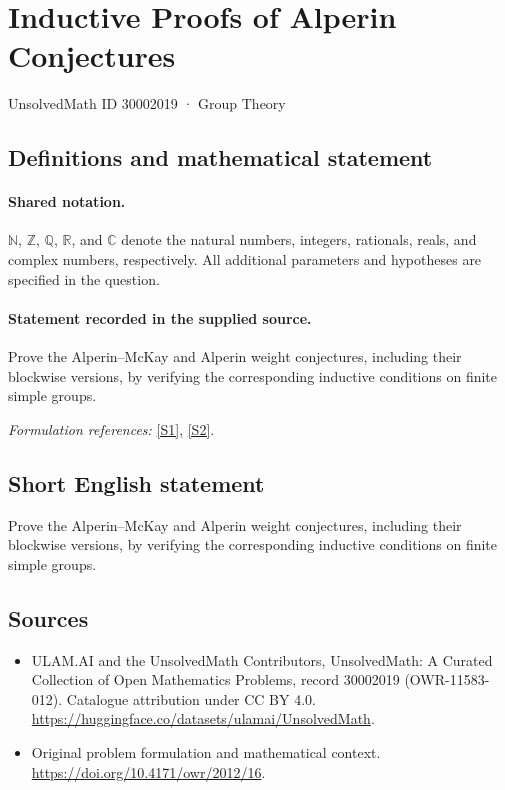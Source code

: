 \documentclass[11pt]{article}
\newcommand{\sref}[2]{\hyperlink{source:#1:#2}{[S#2]}}
\begin{document}
\setcounter{section}{30002018}
\section{Inductive Proofs of Alperin Conjectures}\label{30002019}
{\small UnsolvedMath ID 30002019 · Group Theory}
\subsection{Definitions and mathematical statement}

\paragraph{Shared notation.}$\mathbb N$, $\mathbb Z$, $\mathbb Q$, $\mathbb R$, and $\mathbb C$ denote the natural numbers, integers, rationals, reals, and complex numbers, respectively. All additional parameters and hypotheses are specified in the question.


\paragraph{Statement recorded in the supplied source.}
Prove the Alperin–McKay and Alperin weight conjectures, including their blockwise versions, by verifying the corresponding inductive conditions on finite simple groups.
\par\smallskip\textit{Formulation references:} \sref{30002019}{1}, \sref{30002019}{2}.
\subsection{Short English statement}
Prove the Alperin–McKay and Alperin weight conjectures, including their blockwise versions, by verifying the corresponding inductive conditions on finite simple groups.
\subsection{Sources}
\begin{itemize}
\item[\hypertarget{source:30002019:1}{S1}] ULAM.AI and the UnsolvedMath Contributors, UnsolvedMath: A Curated Collection of Open Mathematics Problems, record 30002019 (OWR-11583-012). Catalogue attribution under CC BY 4.0.
\url{https://huggingface.co/datasets/ulamai/UnsolvedMath}.
\item[\hypertarget{source:30002019:2}{S2}] Original problem formulation and mathematical context.
\url{https://doi.org/10.4171/owr/2012/16}.
\end{itemize}
\label{end:30002019}
\end{document}

